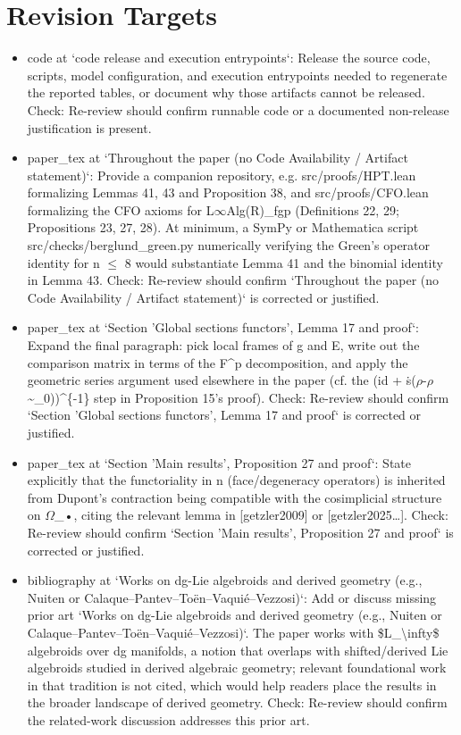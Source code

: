 \documentclass[11pt]{article}
\begin{document}
\section*{Revision Targets}
\begin{itemize}[leftmargin=*]
  \item [open] code at `code release and execution entrypoints`: Release the source code, scripts, model configuration, and execution entrypoints needed to regenerate the reported tables, or document why those artifacts cannot be released. Check: Re-review should confirm runnable code or a documented non-release justification is present.
  \item [open] paper\_tex at `Throughout the paper (no Code Availability / Artifact statement)`: Provide a companion repository, e.g. src/proofs/HPT.lean formalizing Lemmas 41, 43 and Proposition 38, and src/proofs/CFO.lean formalizing the CFO axioms for L\ensuremath{\infty}Alg(R)\_fgp (Definitions 22, 29; Propositions 23, 27, 28). At minimum, a SymPy or Mathematica script src/checks/berglund\_green.py numerically verifying the Green's operator identity for n \ensuremath{\le} 8 would substantiate Lemma 41 and the binomial identity in Lemma 43. Check: Re-review should confirm `Throughout the paper (no Code Availability / Artifact statement)` is corrected or justified.
  \item [open] paper\_tex at `Section 'Global sections functors', Lemma 17 and proof`: Expand the final paragraph: pick local frames of g and E, write out the comparison matrix in terms of the F\^{}p decomposition, and apply the geometric series argument used elsewhere in the paper (cf. the (id + ṡ(\ensuremath{\rho}-\ensuremath{\rho}\~{}\_0))\^{}\{-1\} step in Proposition 15's proof). Check: Re-review should confirm `Section 'Global sections functors', Lemma 17 and proof` is corrected or justified.
  \item [open] paper\_tex at `Section 'Main results', Proposition 27 and proof`: State explicitly that the functoriality in n (face/degeneracy operators) is inherited from Dupont's contraction being compatible with the cosimplicial structure on \ensuremath{\Omega}\_•, citing the relevant lemma in [getzler2009] or [getzler2025…]. Check: Re-review should confirm `Section 'Main results', Proposition 27 and proof` is corrected or justified.
  \item [open] bibliography at `Works on dg-Lie algebroids and derived geometry (e.g., Nuiten or Calaque--Pantev--Toën--Vaquié--Vezzosi)`: Add or discuss missing prior art `Works on dg-Lie algebroids and derived geometry (e.g., Nuiten or Calaque--Pantev--Toën--Vaquié--Vezzosi)`. The paper works with \$L\_\textbackslash{}infty\$ algebroids over dg manifolds, a notion that overlaps with shifted/derived Lie algebroids studied in derived algebraic geometry; relevant foundational work in that tradition is not cited, which would help readers place the results in the broader landscape of derived geometry. Check: Re-review should confirm the related-work discussion addresses this prior art.
\end{itemize}
\end{document}
